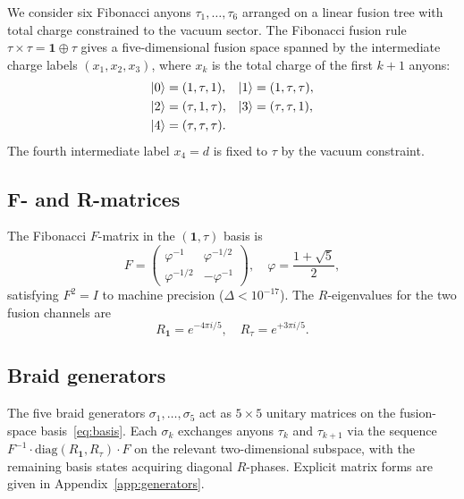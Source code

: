 \documentclass[aps,pra,twocolumn,superscriptaddress,longbibliography,floatfix,nofootinbib]{revtex4-2}
\begin{document}
We consider six Fibonacci anyons $\tau_1,\ldots,\tau_6$ arranged on a
linear fusion tree with total charge constrained to the vacuum
sector.
The Fibonacci fusion rule $\tau\times\tau = \mathbf{1}\oplus\tau$
gives a five-dimensional fusion space spanned by the intermediate
charge labels $(x_1,x_2,x_3)$, where $x_k$ is the total charge of the
first $k+1$ anyons:
\begin{equation}
\label{eq:basis}
\begin{aligned}
\ket{0} &= (1,\tau,1), &
\ket{1} &= (1,\tau,\tau), \\
\ket{2} &= (\tau,1,\tau), &
\ket{3} &= (\tau,\tau,1), \\
\ket{4} &= (\tau,\tau,\tau). &
\end{aligned}
\end{equation}
The fourth intermediate label $x_4=d$ is fixed to $\tau$ by the
vacuum constraint.

\subsection{F- and R-matrices}

The Fibonacci $F$-matrix in the $(\mathbf{1},\tau)$ basis is
\begin{equation}
\label{eq:F}
F = \begin{pmatrix}
\varphi^{-1} & \varphi^{-1/2} \\
\varphi^{-1/2} & -\varphi^{-1}
\end{pmatrix},
\quad \varphi = \frac{1+\sqrt{5}}{2},
\end{equation}
satisfying $F^2 = I$ to machine precision ($\Delta < 10^{-17}$).
The $R$-eigenvalues for the two fusion channels are
\begin{equation}
\label{eq:R}
R_{\mathbf{1}} = e^{-4\pi i/5}, \quad
R_\tau = e^{+3\pi i/5}.
\end{equation}

\subsection{Braid generators}

The five braid generators $\sigma_1,\ldots,\sigma_5$ act as $5\times 5$
unitary matrices on the fusion-space basis~\eqref{eq:basis}.
Each $\sigma_k$ exchanges anyons $\tau_k$ and $\tau_{k+1}$ via the
sequence $F^{-1}\cdot\text{diag}(R_{\mathbf{1}},R_\tau)\cdot F$ on the
relevant two-dimensional subspace, with the remaining basis states
acquiring diagonal $R$-phases.
Explicit matrix forms are given in Appendix~\ref{app:generators}.
\end{document}
